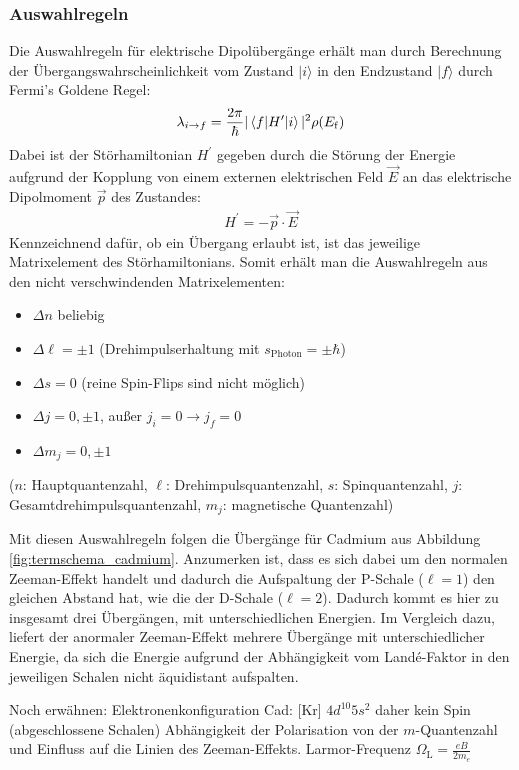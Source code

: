 \documentclass[11pt, a4paper]{article}
\begin{document}
\subsubsection{Auswahlregeln}
Die Auswahlregeln für elektrische Dipolübergänge erhält man durch Berechnung der Übergangswahrscheinlichkeit vom Zustand $|i\rangle$ in den Endzustand $|f\rangle$ durch Fermi's Goldene Regel:
\begin{align}
	\lambda_{i\rightarrow f} = \frac{2 \pi}{\hbar} | \braket{f|H^\prime|i} |^2 \rho(E_\mathrm{f})
\end{align}
Dabei ist der Störhamiltonian $H^\prime$ gegeben durch die Störung der Energie aufgrund der Kopplung von einem externen elektrischen Feld $\vec{E}$ an das elektrische Dipolmoment $\vec{p}$ des Zustandes:
\begin{align}
	H^\prime = - \vec{p} \cdot \vec{E}
\end{align}
Kennzeichnend dafür, ob ein Übergang erlaubt ist, ist das jeweilige Matrixelement des Störhamiltonians.
Somit erhält man die Auswahlregeln aus den nicht verschwindenden Matrixelementen:
\begin{itemize}
	\item $\Delta n$ beliebig
	\item $\Delta \ell = \pm 1$ \quad (Drehimpulserhaltung mit $s_\mathrm{Photon} = \pm \hbar$)
	\item $\Delta s = 0$ \quad (reine Spin-Flips sind nicht möglich)
	\item $\Delta j = 0, \pm 1$, außer $j_i=0 \rightarrow j_f=0$
	\item $\Delta m_j = 0, \pm 1$
\end{itemize}
($n$: Hauptquantenzahl, $\ell$: Drehimpulsquantenzahl, $s$: Spinquantenzahl, $j$: Gesamtdrehimpulsquantenzahl, $m_j$: magnetische Quantenzahl)

Mit diesen Auswahlregeln folgen die Übergänge für Cadmium aus Abbildung \ref{fig:termschema_cadmium}.
Anzumerken ist, dass es sich dabei um den normalen Zeeman-Effekt handelt und dadurch die Aufspaltung der P-Schale ($\ell = 1$) den gleichen Abstand hat, wie die der D-Schale ($\ell = 2$).
Dadurch kommt es hier zu insgesamt drei Übergängen, mit unterschiedlichen Energien.
Im Vergleich dazu, liefert der anormaler Zeeman-Effekt mehrere Übergänge mit unterschiedlicher Energie, da sich die Energie aufgrund der Abhängigkeit vom Landé-Faktor in den jeweiligen Schalen nicht äquidistant aufspalten.

Noch erwähnen:
Elektronenkonfiguration Cad: [Kr] $4d^{10} 5s^2$ daher kein Spin (abgeschlossene Schalen)
 Abhängigkeit der Polarisation von der $m$-Quantenzahl und Einfluss auf die Linien des Zeeman-Effekts. Larmor-Frequenz $\Omega_\mathrm{L} = \frac{e B}{2 m_e}$
\end{document}
